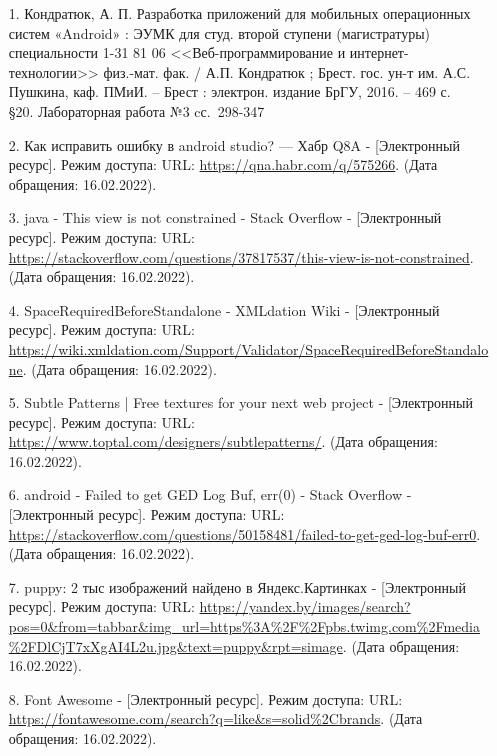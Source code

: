 \documentclass[12pt, a4paper, simple]{eskdtext}
\begin{document}
    \begin{enumerate}
        \item[1.] Кондратюк, А. П.
        Разработка приложений для мобильных операционных систем «Android» : ЭУМК для
        студ. второй ступени (магистратуры) специальности 1-31 81 06 <<Веб-программирование и интернет-технологии>>
        физ.-мат. фак. / А.П. Кондратюк ; Брест. гос. ун-т им. А.С. Пушкина, каф. ПМиИ. – Брест : электрон. издание БрГУ, 2016. – 469 с.\\
        §20. Лабораторная работа №3 cс.~298-347

        \item[2.] Как исправить ошибку в android studio? — Хабр Q8A
        - [Электронный ресурс]. Режим доступа:
        URL: \url{https://qna.habr.com/q/575266}.
        (Дата обращения: 16.02.2022).

        \item[3.] java - This view is not constrained - Stack Overflow
        - [Электронный ресурс]. Режим доступа:
        URL: \url{https://stackoverflow.com/questions/37817537/this-view-is-not-constrained}.
        (Дата обращения: 16.02.2022).

        \item[4.] SpaceRequiredBeforeStandalone - XMLdation Wiki
        - [Электронный ресурс]. Режим доступа:
        URL: \url{https://wiki.xmldation.com/Support/Validator/SpaceRequiredBeforeStandalone}.
        (Дата обращения: 16.02.2022).

        \item[5.] Subtle Patterns | Free textures for your next web project
        - [Электронный ресурс]. Режим доступа:
        URL: \url{https://www.toptal.com/designers/subtlepatterns/}.
        (Дата обращения: 16.02.2022).

        \item[6.] android - Failed to get GED Log Buf, err(0) - Stack Overflow
        - [Электронный ресурс]. Режим доступа:
        URL: \url{https://stackoverflow.com/questions/50158481/failed-to-get-ged-log-buf-err0}.
        (Дата обращения: 16.02.2022).

        \item[7.] puppy: 2 тыс изображений найдено в Яндекс.Картинках
        - [Электронный ресурс]. Режим доступа:
        URL: \url{https://yandex.by/images/search?pos=0&from=tabbar&img_url=https%3A%2F%2Fpbs.twimg.com%2Fmedia%2FDlCjT7xXgAI4L2u.jpg&text=puppy&rpt=simage}.
        (Дата обращения: 16.02.2022).

        \item[8.] Font Awesome
        - [Электронный ресурс]. Режим доступа:
        URL: \url{https://fontawesome.com/search?q=like&s=solid%2Cbrands}.
        (Дата обращения: 16.02.2022).


\end{enumerate}
\end{document}
